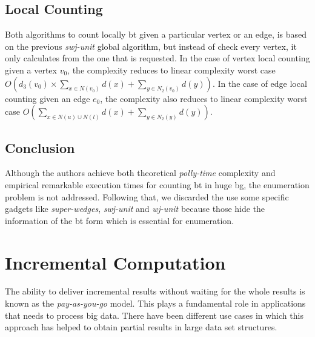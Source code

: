 \subsection{Local Counting}
Both algorithms to count locally \acrshort{bt} given a particular vertex or an edge, is based on the previous \emph{swj-unit} global algorithm, 
but instead of check every vertex, it only calculates from the one that is requested. 
In the case of vertex local counting given a vertex $v_0$, the complexity reduces to linear complexity worst case $O(d_3(v_0) \times \sum_{x \in N(v_0)} d(x) + \sum_{y \in N_2(v_0)} d(y))$.
In the case of edge local counting given an edge $e_0$, the complexity also reduces to linear complexity worst case $O(\sum_{x \in N(u) \cup N(l)} d(x) + \sum_{y \in N_2(y)} d(y))$.

\subsection{Conclusion}
Although the authors achieve both theoretical \emph{polly-time} complexity and empirical remarkable execution times for counting \acrshort{bt} in huge \acrshort{bg}, the enumeration problem is not addressed. 
Following that, we discarded the use some specific gadgets like \emph{super-wedges}, \emph{swj-unit} and \emph{wj-unit} because those hide the information of the \acrshort{bt}
form which is essential for enumeration.

\section{Incremental Computation}
The ability to deliver incremental results without waiting for the whole results is known as the \emph{pay-as-you-go} model. This plays a fundamental role in applications that needs to process big data. 
There have been different use cases in which this approach has helped to obtain partial results in large data set structures.

